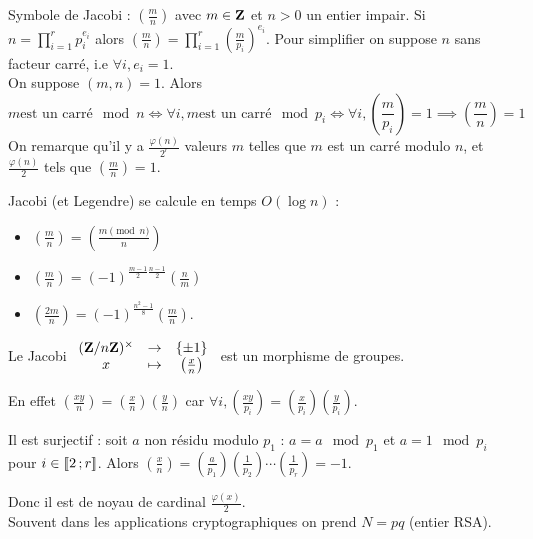 Symbole de Jacobi : $\left( \frac{m}{n} \right)$ avec $m \in \mathbf{Z}$ et $n > 0$ un entier impair.
Si $n = \prod_{i = 1}^r p_i^{e_i}$ alors $\left( \frac{m}{n} \right) = \prod_{i = 1}^r \left( \frac{m}{p_i} \right)^{e_i}$.
Pour simplifier on suppose $n$ sans facteur carré, i.e $\forall i, e_i = 1$.\\

On suppose $(m,n) = 1$.
Alors
$$m \text{est un carré} \mod n
	\iff \forall i, m \text{est un carré} \mod p_i
	\iff \forall i, \left( \frac{m}{p_i} \right) = 1
	\implies \left( \frac{m}{n} \right) = 1$$
On remarque qu'il y a $\frac{\varphi(n)}{2^r}$ valeurs $m$ telles que $m$ est un carré modulo $n$, et $\frac{\varphi(n)}{2}$ tels que $\left( \frac{m}{n} \right) = 1$.

Jacobi (et Legendre) se calcule en temps $O(\log n)$ :
\begin{itemize}
	\item[\textbullet] $\left( \frac{m}{n} \right) = \left( \frac{m \pmod n}{n} \right)$
	\item[\textbullet] $\left( \frac{m}{n} \right) = (-1)^{\frac{m - 1}{2} \frac{n - 1}{2}} \left( \frac{n}{m} \right)$
	\item[\textbullet] $\left( \frac{2m}{n} \right) = (-1)^{\frac{n^2 - 1}{8}} \left( \frac{m}{n} \right)$.
\end{itemize}

Le Jacobi $\begin{array}{ccc} (\mathbf{Z} / n\mathbf{Z})^\times & \to & \{ \pm 1 \} \\ x & \mapsto & \left( \frac{x}{n} \right) \end{array}$ est un morphisme de groupes.

En effet $\left( \frac{xy}{n} \right) = \left( \frac{x}{n} \right) \left( \frac{y}{n} \right)$ car $\forall i, \left( \frac{xy}{p_i} \right) = \left( \frac{x}{p_i} \right) \left( \frac{y}{p_i} \right)$.

Il est surjectif : soit $a$ non résidu modulo $p_1$ : $a = a \mod p_1$ et $a = 1 \mod p_i$ pour $i \in \mathopen{}\mathclose{\left[\![2\mathclose{}\mathpunct{};r\right]\!]}$.
Alors $\left( \frac{x}{n} \right) = \left( \frac{a}{p_1} \right) \left( \frac{1}{p_2} \right) \cdots \left( \frac{1}{p_r} \right) = -1$.

Donc il est de noyau de cardinal $\frac{\varphi(x)}{2}$.\\


Souvent dans les applications cryptographiques on prend $N = pq$ (entier RSA).

